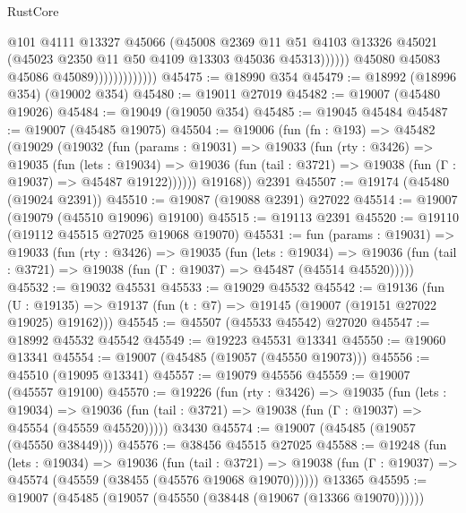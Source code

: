 \begin{lexlean}{RustCore}
\begin{coremodule}
                                      @101
                                      @4111
                                      @13327
                                      @45066
                                      (@45008
                                        @2369
                                        @11
                                        @51
                                        @4103
                                        @13326
                                        @45021
                                        (@45023 @2350 @11 @50 @4109 @13303 @45036 @45313))))))
                              @45080
                              @45083
                              @45086
                              @45089)))))))))))))
@45475 := @18990 @354
@45479 := @18992 (@18996 @354) (@19002 @354)
@45480 := @19011 @27019
@45482 := @19007 (@45480 @19026)
@45484 := @19049 (@19050 @354)
@45485 := @19045 @45484
@45487 := @19007 (@45485 @19075)
@45504 := @19006
    (fun (fn : @193) =>
    @45482
      (@19029
        (@19032
          (fun (params : @19031) =>
          @19033
            (fun (rty : @3426) =>
            @19035
              (fun (lets : @19034) =>
              @19036 (fun (tail : @3721) => @19038 (fun (Γ : @19037) => @45487 @19122))))))
        @19168))
    @2391
@45507 := @19174 (@45480 (@19024 @2391))
@45510 := @19087 (@19088 @2391) @27022
@45514 := @19007 (@19079 (@45510 @19096) @19100)
@45515 := @19113 @2391
@45520 := @19110 (@19112 @45515 @27025 @19068 @19070)
@45531 := fun (params : @19031) =>
  @19033
    (fun (rty : @3426) =>
    @19035
      (fun (lets : @19034) =>
      @19036 (fun (tail : @3721) => @19038 (fun (Γ : @19037) => @45487 (@45514 @45520)))))
@45532 := @19032 @45531
@45533 := @19029 @45532
@45542 := @19136
    (fun (U : @19135) => @19137 (fun (t : @7) => @19145 (@19007 (@19151 @27022 @19025) @19162)))
@45545 := @45507 (@45533 @45542) @27020
@45547 := @18992 @45532 @45542
@45549 := @19223 @45531 @13341
@45550 := @19060 @13341
@45554 := @19007 (@45485 (@19057 (@45550 @19073)))
@45556 := @45510 (@19095 @13341)
@45557 := @19079 @45556
@45559 := @19007 (@45557 @19100)
@45570 := @19226
    (fun (rty : @3426) =>
    @19035
      (fun (lets : @19034) =>
      @19036 (fun (tail : @3721) => @19038 (fun (Γ : @19037) => @45554 (@45559 @45520)))))
    @3430
@45574 := @19007 (@45485 (@19057 (@45550 @38449)))
@45576 := @38456 @45515 @27025
@45588 := @19248
    (fun (lets : @19034) =>
    @19036
      (fun (tail : @3721) =>
      @19038 (fun (Γ : @19037) => @45574 (@45559 (@38455 (@45576 @19068 @19070))))))
    @13365
@45595 := @19007 (@45485 (@19057 (@45550 (@38448 (@19067 (@13366 @19070))))))

\end{coremodule}
\end{lexlean}
